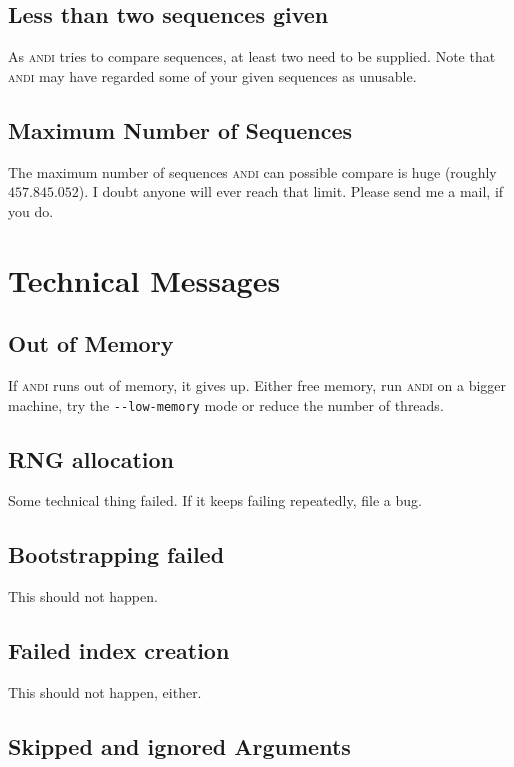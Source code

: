 \documentclass[a4paper,
  10pt,
  english,
  DIV=12,
  BCOR=8mm]{scrbook}
\newcommand{\algo}[1]{\textsc{{#1}}}
\newcommand{\andi}{\algo{andi}\xspace}
\begin{document}
\subsection*{Less than two sequences given}

As \andi tries to compare sequences, at least two need to be supplied. Note that \andi may have regarded some of your given sequences as unusable.

\subsection*{Maximum Number of Sequences}

The maximum number of sequences \andi can possible compare is huge (roughly $457.845.052$). I doubt anyone will ever reach that limit. Please send me a mail, if you do.

\section{Technical Messages}

\subsection*{Out of Memory}

If \andi runs out of memory, it gives up. Either free memory, run \andi on a bigger machine, try the \lstinline$--low-memory$ mode or reduce the number of threads.

\subsection*{RNG allocation}

Some technical thing failed. If it keeps failing repeatedly, file a bug.

\subsection*{Bootstrapping failed}

This should not happen.

\subsection*{Failed index creation}

This should not happen, either.

\subsection*{Skipped and ignored Arguments}
\end{document}
